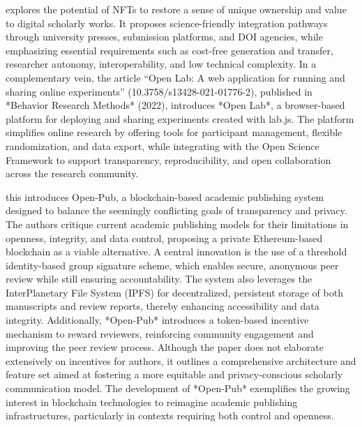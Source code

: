 \documentclass{article}
\begin{document}
\cite{putnings_non-fungible_2022} explores the potential of NFTs to restore a sense of unique ownership and value to digital scholarly works. It proposes science-friendly integration pathways through university presses, submission platforms, and DOI agencies, while emphasizing essential requirements such as cost-free generation and transfer, researcher autonomy, interoperability, and low technical complexity. In a complementary vein, the article “Open Lab: A web application for running and sharing online experiments” (10.3758/s13428-021-01776-2), published in *Behavior Research Methods* (2022), introduces *Open Lab*, a browser-based platform for deploying and sharing experiments created with lab.js. The platform simplifies online research by offering tools for participant management, flexible randomization, and data export, while integrating with the Open Science Framework to support transparency, reproducibility, and open collaboration across the research community.

\cite{zhou_open-pub_2021} this introduces Open-Pub, a blockchain-based academic publishing system designed to balance the seemingly conflicting goals of transparency and privacy. The authors critique current academic publishing models for their limitations in openness, integrity, and data control, proposing a private Ethereum-based blockchain as a viable alternative. A central innovation is the use of a threshold identity-based group signature scheme, which enables secure, anonymous peer review while still ensuring accountability. The system also leverages the InterPlanetary File System (IPFS) for decentralized, persistent storage of both manuscripts and review reports, thereby enhancing accessibility and data integrity. Additionally, *Open-Pub* introduces a token-based incentive mechanism to reward reviewers, reinforcing community engagement and improving the peer review process. Although the paper does not elaborate extensively on incentives for authors, it outlines a comprehensive architecture and feature set aimed at fostering a more equitable and privacy-conscious scholarly communication model. The development of *Open-Pub* exemplifies the growing interest in blockchain technologies to reimagine academic publishing infrastructures, particularly in contexts requiring both control and openness.
\end{document}
